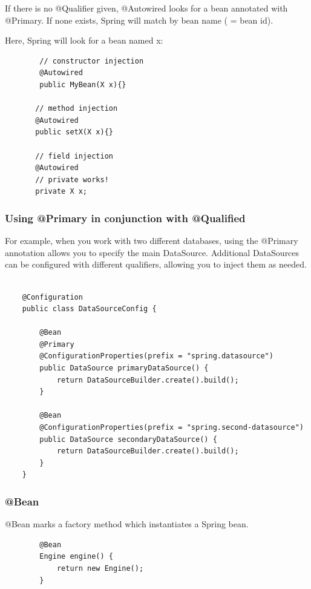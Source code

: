 \documentclass{scrartcl}
\begin{document}
    If there is no @Qualifier given, @Autowired looks for a bean annotated with @Primary. If none exists, Spring will match by bean name ( = bean id).

    Here, Spring will look for a bean named x:

    \begin{lstlisting}
        // constructor injection
        @Autowired
        public MyBean(X x){}

       // method injection
       @Autowired
       public setX(X x){}

       // field injection
       @Autowired
       // private works!
       private X x;
    \end{lstlisting}

\subsubsection{Using @Primary in conjunction with @Qualified}

For example, when you work with two different databases, using the @Primary annotation allows you to specify the main DataSource. Additional DataSources can be configured with different qualifiers, allowing you to inject them as needed.

\begin{lstlisting}

    @Configuration
    public class DataSourceConfig {

        @Bean
        @Primary
        @ConfigurationProperties(prefix = "spring.datasource")
        public DataSource primaryDataSource() {
            return DataSourceBuilder.create().build();
        }

        @Bean
        @ConfigurationProperties(prefix = "spring.second-datasource")
        public DataSource secondaryDataSource() {
            return DataSourceBuilder.create().build();
        }
    }

\end{lstlisting}

\subsubsection{@Bean}

    @Bean marks a factory method which instantiates a Spring bean.

    \begin{lstlisting}
        @Bean
        Engine engine() {
            return new Engine();
        }
    \end{lstlisting}
\end{document}
